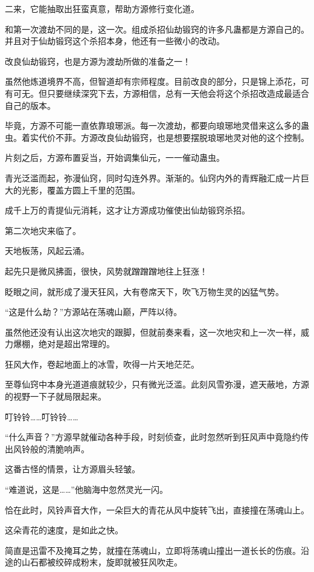 \begin{this_body}
二来，它能抽取出狂蛮真意，帮助方源修行变化道。

和第一次渡劫不同的是，这一次。组成杀招仙劫锻窍的许多凡蛊都是方源自己的。并且对于仙劫锻窍这个杀招本身，他还有一些微小的改动。

改良仙劫锻窍，也是方源为渡劫所做的准备之一！

虽然他炼道境界不高，但智道却有宗师程度。目前改良的部分，只是锦上添花，可有可无。但只要继续深究下去，方源相信，总有一天他会将这个杀招改造成最适合自己的版本。

毕竟，方源不可能一直依靠琅琊派。每一次渡劫，都要向琅琊地灵借来这么多的蛊虫。着实代价不菲。方源改良仙劫锻窍，也是想要摆脱琅琊地灵对他的这个控制。

片刻之后，方源布置妥当，开始调集仙元，一一催动蛊虫。

青光泛滥而起，弥漫仙窍，同时勾连外界。渐渐的。仙窍内外的青辉融汇成一片巨大的光影，覆盖方圆上千里的范围。

成千上万的青提仙元消耗，这才让方源成功催使出仙劫锻窍杀招。

第二次地灾来临了。

天地板荡，风起云涌。

起先只是微风拂面，很快，风势就蹭蹭蹭地往上狂涨！

眨眼之间，就形成了漫天狂风，大有卷席天下，吹飞万物生灵的凶猛气势。

“这是什么劫？”方源站在荡魂山巅，严阵以待。

虽然他还没有认出这次地灾的跟脚，但就前奏来看，这一次地灾和上一次一样，威力爆棚，绝对是超出常理的。

狂风大作，卷起地面上的冰雪，吹得一片天地茫茫。

至尊仙窍中本身光道道痕就较少，只有微光泛滥。此刻风雪弥漫，遮天蔽地，方源的视野一下子就局限起来。

叮铃铃……叮铃铃……

“什么声音？”方源早就催动各种手段，时刻侦查，此时忽然听到狂风声中竟隐约传出风铃般的清脆响声。

这番古怪的情景，让方源眉头轻皱。

“难道说，这是……”他脑海中忽然灵光一闪。

恰在此时，风铃声音大作，一朵巨大的青花从风中旋转飞出，直接撞在荡魂山上。

这朵青花的速度，是如此之快。

简直是迅雷不及掩耳之势，就撞在荡魂山，立即将荡魂山撞出一道长长的伤痕。沿途的山石都被绞碎成粉末，旋即就被狂风吹走。


\end{this_body}
